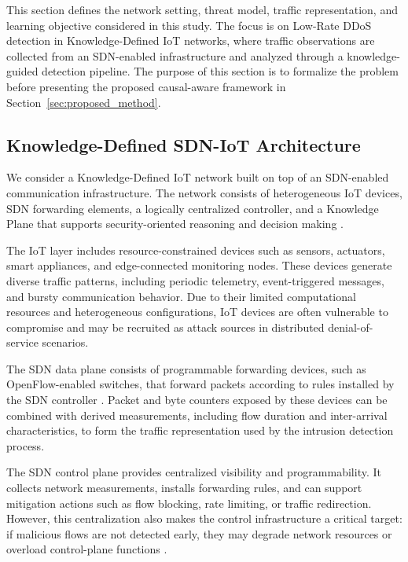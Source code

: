 \documentclass[journal]{IEEEtran}
\begin{document}
This section defines the network setting, threat model, traffic representation, and learning objective considered in this study. The focus is on Low-Rate DDoS detection in Knowledge-Defined IoT networks, where traffic observations are collected from an SDN-enabled infrastructure and analyzed through a knowledge-guided detection pipeline. The purpose of this section is to formalize the problem before presenting the proposed causal-aware framework in Section~\ref{sec:proposed_method}.

\subsection{Knowledge-Defined SDN-IoT Architecture}
\label{subsec:kdn_sdn_iot_architecture}

We consider a Knowledge-Defined IoT network built on top of an SDN-enabled communication infrastructure. The network consists of heterogeneous IoT devices, SDN forwarding elements, a logically centralized controller, and a Knowledge Plane that supports security-oriented reasoning and decision making \cite{mestres2017kdn}.

The IoT layer includes resource-constrained devices such as sensors, actuators, smart appliances, and edge-connected monitoring nodes. These devices generate diverse traffic patterns, including periodic telemetry, event-triggered messages, and bursty communication behavior. Due to their limited computational resources and heterogeneous configurations, IoT devices are often vulnerable to compromise and may be recruited as attack sources in distributed denial-of-service scenarios.

The SDN data plane consists of programmable forwarding devices, such as OpenFlow-enabled switches, that forward packets according to rules installed by the SDN controller \cite{mckeown2008openflow}. Packet and byte counters exposed by these devices can be combined with derived measurements, including flow duration and inter-arrival characteristics, to form the traffic representation used by the intrusion detection process.

The SDN control plane provides centralized visibility and programmability. It collects network measurements, installs forwarding rules, and can support mitigation actions such as flow blocking, rate limiting, or traffic redirection. However, this centralization also makes the control infrastructure a critical target: if malicious flows are not detected early, they may degrade network resources or overload control-plane functions \cite{yan2016sdn_ddos}.
\end{document}
